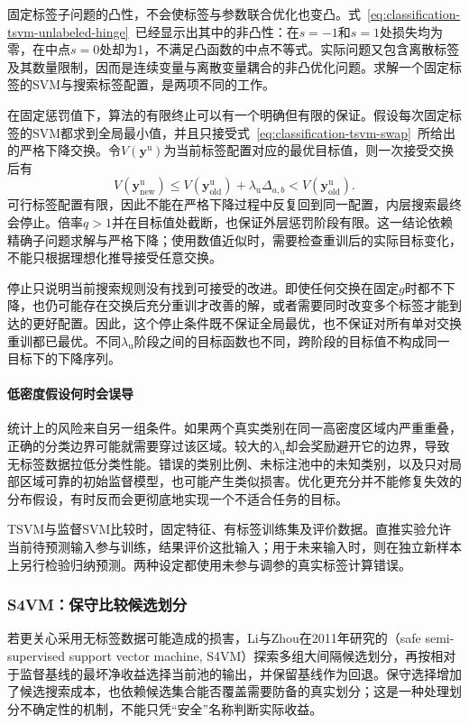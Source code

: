固定标签子问题的凸性，不会使标签与参数联合优化也变凸。式~\eqref{eq:classification-tsvm-unlabeled-hinge}~已经显示出其中的非凸性：在$s=-1$和$s=1$处损失均为零，在中点$s=0$处却为1，不满足凸函数的中点不等式。实际问题又包含离散标签及其数量限制，因而是连续变量与离散变量耦合的非凸优化问题。求解一个固定标签的SVM与搜索标签配置，是两项不同的工作。

在固定惩罚值下，算法的有限终止可以有一个明确但有限的保证。假设每次固定标签的SVM都求到全局最小值，并且只接受式~\eqref{eq:classification-tsvm-swap}~所给出的严格下降交换。令$V(\bm{y}^{\mathrm{u}})$为当前标签配置对应的最优目标值，则一次接受交换后有
\[
  V(\bm{y}_{\mathrm{new}}^{\mathrm{u}})
    \leq V(\bm{y}_{\mathrm{old}}^{\mathrm{u}})
      +\lambda_{\mathrm{u}}\Delta_{a,b}
    <V(\bm{y}_{\mathrm{old}}^{\mathrm{u}}).
\]
可行标签配置有限，因此不能在严格下降过程中反复回到同一配置，内层搜索最终会停止。倍率$q>1$并在目标值处截断，也保证外层惩罚阶段有限。这一结论依赖精确子问题求解与严格下降；使用数值近似时，需要检查重训后的实际目标变化，不能只根据理想化推导接受任意交换。

停止只说明当前搜索规则没有找到可接受的改进。即使任何交换在固定$g$时都不下降，也仍可能存在交换后充分重训才改善的解，或者需要同时改变多个标签才能到达的更好配置。因此，这个停止条件既不保证全局最优，也不保证对所有单对交换重训都已最优。不同$\lambda_{\mathrm{u}}$阶段之间的目标函数也不同，跨阶段的目标值不构成同一目标下的下降序列。

\paragraph{低密度假设何时会误导}
统计上的风险来自另一组条件。如果两个真实类别在同一高密度区域内严重重叠，正确的分类边界可能就需要穿过该区域。较大的$\lambda_{\mathrm{u}}$却会奖励避开它的边界，导致无标签数据拉低分类性能。错误的类别比例、未标注池中的未知类别，以及只对局部区域可靠的初始监督模型，也可能产生类似损害。优化更充分并不能修复失效的分布假设，有时反而会更彻底地实现一个不适合任务的目标。

TSVM与监督SVM比较时，固定特征、有标签训练集及评价数据。直推实验允许当前待预测输入参与训练，结果评价这批输入；用于未来输入时，则在独立新样本上另行检验归纳预测。两种设定都使用未参与调参的真实标签计算错误。

\subsubsection{S4VM：保守比较候选划分}

若更关心采用无标签数据可能造成的损害，Li与Zhou在2011年研究的（safe semi-supervised support vector machine, S4VM）探索多组大间隔候选划分，再按相对于监督基线的最坏净收益选择当前池的输出，并保留基线作为回退。保守选择增加了候选搜索成本，也依赖候选集合能否覆盖需要防备的真实划分；这是一种处理划分不确定性的机制，不能只凭“安全”名称判断实际收益。


